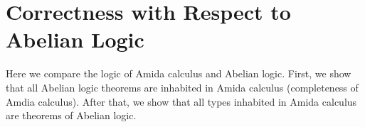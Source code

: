


\section{Correctness with Respect to Abelian Logic}
\label{correct-abelian}

Here we compare the logic of Amida calculus and Abelian logic.
First, we show that all Abelian logic theorems are inhabited in Amida
calculus (completeness of Amdia calculus).
After that, we show that all types inhabited in Amida calculus are
theorems of Abelian logic.

